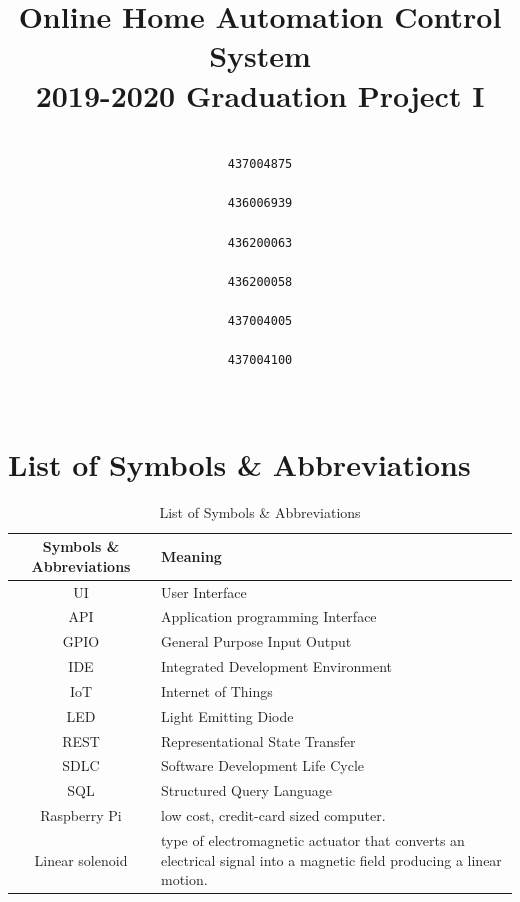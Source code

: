 \documentclass[12pt, oneside, a4paper]{book}
\date{}
\title{
	\color{chapter}
	Online Home Automation Control System \\
	\color{black}\large 2019-2020 Graduation Project I}
\author{
	\setcode{utf8}
	\RL{ريم علي الغامدي} 
	\\\texttt{437004875}
	\\[3ex]
	\RL{ساره خالد آل حسين} 
	\\\texttt{436006939}
	\\[3ex]
	\RL{ضحى نضال الزعبي} 
	\\\texttt{436200063}
	\\[3ex]
	\RL{عبير أحمد عزت} 
	\\\texttt{436200058}
	\\[3ex]
	\RL{منى سعود الخثلان} 
	\\\texttt{437004005}
	\\[3ex]
	\RL{نوف عبد الله الدعجاني} 
	\\\texttt{437004100}
	\\	\\
	\Large\RL{د. عبير محمود} 
}
\newcommand\boldcolor[1]{\textcolor{bold}{\textbf{#1}}}
\begin{document}
	
	
	\maketitle
	\newpage


	\tableofcontents
	\newpage	
	\doublespacing
	\newpage
	
	\listoftables
	\newpage
	
	\listoffigures
	\newpage
	
	\chapter*{List of Symbols \& Abbreviations}
	\label{sec:sym}
	\def\arraystretch{1.5}
	\begin{table}[H]
		\caption{List of Symbols \& Abbreviations}
		\begin{center}
			\begin{tabularx}{\linewidth}{|c|X|}\hline
				
				\boldcolor{Symbols \& Abbreviations} & \boldcolor{Meaning} \\\hline
				UI & User Interface\\\hline
				API & Application programming Interface\\\hline
				GPIO & General Purpose Input Output\\\hline
				IDE & Integrated Development Environment \\\hline
				IoT & Internet of Things \\\hline
				LED & Light Emitting Diode\\\hline
				REST & Representational State Transfer\\\hline
				SDLC & Software Development Life Cycle\\\hline
				SQL & Structured Query Language\\\hline
				Raspberry Pi & low cost, credit-card sized computer\cite{raspberry}. \\\hline
				Linear solenoid &  type of electromagnetic actuator that converts an electrical signal into a magnetic field producing a linear motion\cite{linear}.\\\hline
			\end{tabularx}
		\end{center}
	\end{table}
\end{document}
